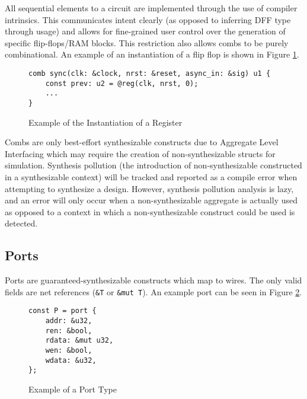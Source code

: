 \documentclass[10pt]{article}
\begin{document}
\begin{mdframed}[frametitle=A Note on Sequential Elements]
	All sequential elements to a circuit are implemented through the use of compiler intrinsics. This
	communicates intent clearly (as opposed to inferring DFF type through usage) and allows for
	fine-grained user control over the generation of specific flip-flops/RAM blocks. This restriction
	also allows combs to be purely combinational. An example of an instantiation of a flip flop is shown
	in Figure \ref{fig:seq_example}.

	\begin{figure}[H]
		\begin{verbatim}
comb sync(clk: &clock, nrst: &reset, async_in: &sig) u1 {
    const prev: u2 = @reg(clk, nrst, 0);
    ...
}
    \end{verbatim}
		\vspace*{-10mm}
		\caption{Example of the Instantiation of a Register}
		\label{fig:seq_example}
	\end{figure}
\end{mdframed}

\begin{mdframed}[frametitle=A Note on the Synthesizability of Combs]
	Combs are only best-effort synthesizable constructs due to Aggregate Level Interfacing which may
	require the creation of non-synthesizable structs for simulation. Synthesis pollution (the
	introduction of non-synthesizable constructed in a synthesizable context) will be tracked and
	reported as a compile error when attempting to synthesize a design. However, synthesis pollution
	analysis is lazy, and an error will only occur when a non-synthesizable aggregate is actually
	used as opposed to a context in which a non-synthesizable construct could be used is detected.
\end{mdframed}

\subsection{Ports}
Ports are guaranteed-synthesizable constructs which map to wires. The only valid fields are net
references (\verb|&T| or \verb|&mut T|). An example port can be seen in Figure
\ref{fig:port_example}.

\begin{figure}[H]
	\begin{verbatim}
const P = port {
    addr: &u32,
    ren: &bool,
    rdata: &mut u32,
    wen: &bool,
    wdata: &u32,
};
    \end{verbatim}
	\vspace*{-10mm}
	\caption{Example of a Port Type}
	\label{fig:port_example}
\end{figure}
\end{document}
